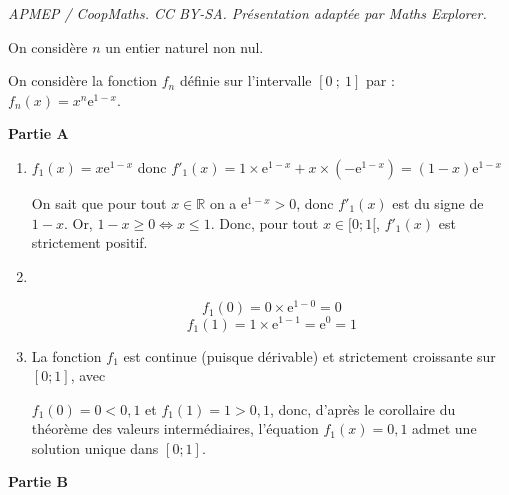 \documentclass[10pt]{article}
\providecommand{\R}{\mathbb{R}}
\providecommand{\e}{{\mathrm{e}}}
\providecommand{\intervFO}[2]{{[#1;#2[}}
\providecommand{\intervFF}[2]{\ensuremath{[#1;#2]}}
\begin{document}
\noindent\textit{APMEP / CoopMaths. CC BY-SA. Présentation adaptée par Maths Explorer.}\par\medskip
\smallskip

On considère $n$ un entier naturel non nul.

On considère la fonction $f_n$ définie sur l'intervalle $[0~;~1]$ par :
$f_n(x) = x^n \e^{1 - x}.$

\smallskip

\textbf{Partie A}

\smallskip

\begin{enumerate}
	\item  $f_1(x)=x \e^{1-x}$ donc $f'_{1}(x) = 1 \times \e^{1 - x} + x \times \left(-\e^{1-x}\right) = \boxed{(1-x)\e^{1-x}}$

On sait que pour tout $x \in \R$ on a $\e^{1-x} > 0$, donc $f'_{1}(x)$ est du signe de $1 - x$. Or, $1 - x \geqslant 0 \iff x \leqslant 1$. Donc, pour tout $x \in \intervFO{0}{1}$, $f'_{1}(x)$ est strictement positif.

	\item\
	
\begin{minipage}{.667\textwidth}
	\begin{center}
	\end{center}
	\end{minipage}\hfill
	\begin{minipage}[t]{.275\textwidth}
	\[f_{1}(0) = 0 \times \e^{1-0} = 0\]
	\[f_{1}(1) = 1 \times \e^{1-1} = \e^{0} = 1\]
\end{minipage}

\smallskip

	\item La fonction $f_{1}$ est continue (puisque dérivable) et strictement croissante sur \intervFF{0}{1}, avec

$f_{1}(0) = 0 < 0,1$ et $f_{1}(1) = 1 > 0,1$, donc, d'après le corollaire du théorème des valeurs intermédiaires, l'équation $f_{1}(x) = 0,1$ admet une solution unique dans \intervFF{0}{1}.
\end{enumerate}

\smallskip

\textbf{Partie B}
\end{document}

